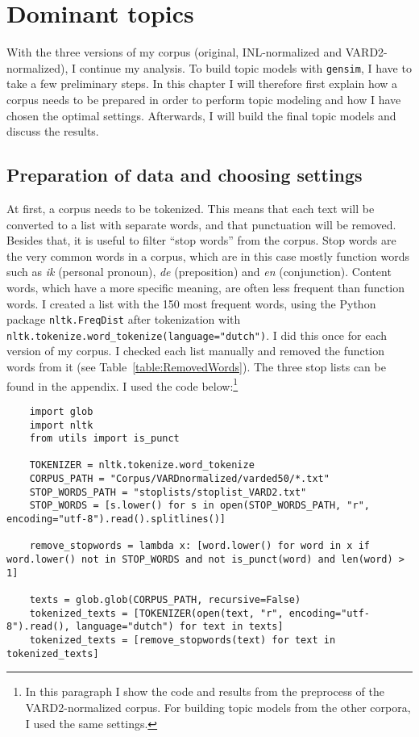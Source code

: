 \chapter{Dominant topics}
With the three versions of my corpus (original, INL-normalized and VARD2-normalized), I continue my analysis. To build topic models with \texttt{gensim}, I have to take a few preliminary steps. In this chapter I will therefore first explain how a corpus needs to be prepared in order to perform topic modeling and how I have chosen the optimal settings. Afterwards, I will build the final topic models and discuss the results.

\section{Preparation of data and choosing settings}
At first, a corpus needs to be tokenized. This means that each text will be converted to a list with separate words, and that punctuation will be removed. Besides that, it is useful to filter \enquote{stop words} from the corpus. Stop words are the very common words in a corpus, which are in this case mostly function words such as \textit{ik} (personal pronoun), \textit{de} (preposition) and \textit{en} (conjunction). Content words, which have a more specific meaning, are often less frequent than function words. I created a list with the 150 most frequent words, using the Python package \texttt{nltk.FreqDist} after tokenization with \texttt{nltk.tokenize.word\_tokenize(language="dutch")}. I did this once for each version of my corpus. I checked each list manually and removed the function words from it (see Table~\ref{table:RemovedWords}). The three stop lists can be found in the appendix. I used the code below:\footnote{In this paragraph I show the code and results from the preprocess of the VARD2-normalized corpus. For building topic models from the other corpora, I used the same settings.}

\begin{lstlisting}
	import glob
	import nltk
	from utils import is_punct
	
	TOKENIZER = nltk.tokenize.word_tokenize
	CORPUS_PATH = "Corpus/VARDnormalized/varded50/*.txt"
	STOP_WORDS_PATH = "stoplists/stoplist_VARD2.txt"
	STOP_WORDS = [s.lower() for s in open(STOP_WORDS_PATH, "r", encoding="utf-8").read().splitlines()]
	
	remove_stopwords = lambda x: [word.lower() for word in x if word.lower() not in STOP_WORDS and not is_punct(word) and len(word) > 1]
	
	texts = glob.glob(CORPUS_PATH, recursive=False)
	tokenized_texts = [TOKENIZER(open(text, "r", encoding="utf-8").read(), language="dutch") for text in texts]
	tokenized_texts = [remove_stopwords(text) for text in tokenized_texts]
\end{lstlisting}

